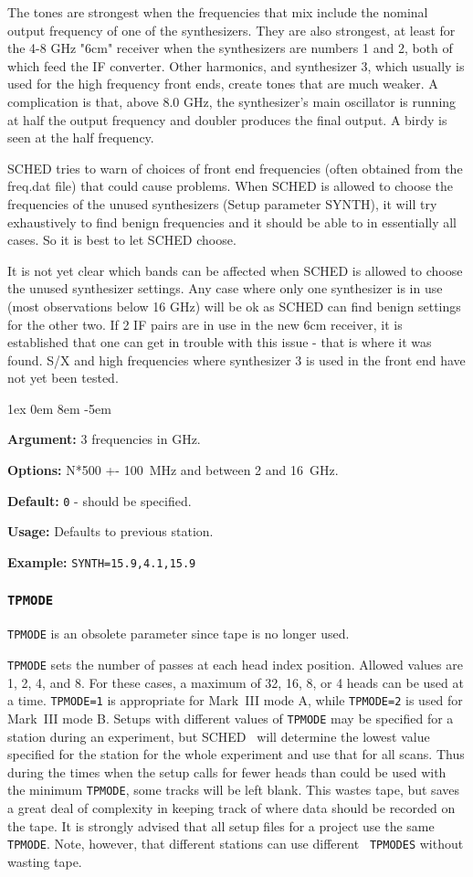 \documentclass{report}
\newcommand{\schedb}{{\sc SCHED~}}
\newcommand{\rcwbox}[5]{
  \begin{list}{}{\parsep 1ex  \itemsep 0em
                 \leftmargin 8em  \itemindent -5em }
    \item {\bf Argument:} #1
    \item {\bf Options:}  #2
    \item {\bf Default:}  #3
    \item {\bf Usage:}    #4
    \item {\bf Example:}  #5
  \end{list}
}
\begin{document}
The tones are strongest when the frequencies that mix include the
nominal output frequency of one of the synthesizers.  They are also
strongest, at least for the 4-8 GHz "6cm" receiver when the
synthesizers are numbers 1 and 2, both of which feed the IF converter.
Other harmonics, and synthesizer 3, which usually is used for the high
frequency front ends, create tones that are much weaker.  A
complication is that, above 8.0 GHz, the synthesizer's main oscillator
is running at half the output frequency and doubler produces the final
output.  A birdy is seen at the half frequency.

SCHED tries to warn of choices of front end frequencies (often
obtained from the freq.dat file) that could cause problems.  When
SCHED is allowed to choose the frequencies of the unused synthesizers
(Setup parameter SYNTH), it will try exhaustively to find benign
frequencies and it should be able to in essentially all cases.  So it
is best to let SCHED choose.

It is not yet clear which bands can be affected when SCHED is allowed
to choose the unused synthesizer settings.  Any case where only one
synthesizer is in use (most observations below 16 GHz) will be ok as
SCHED can find benign settings for the other two.  If 2 IF pairs are
in use in the new 6cm receiver, it is established that one can get in
trouble with this issue - that is where it was found. S/X and high
frequencies where synthesizer 3 is used in the front end have not yet
been tested.

\rcwbox
{3 frequencies in GHz.}
{N*500 +- 100~MHz and between 2 and 16~GHz.}
{{\tt 0} - should be specified.}
{Defaults to previous station.}
{{\tt SYNTH=15.9,4.1,15.9}}


\subsubsection{\label{SP:TPMODE}{\tt TPMODE}}

{\tt TPMODE} is an obsolete parameter since tape is no longer used.

{\tt TPMODE} sets the number of passes at each head index
position. Allowed values are 1, 2, 4, and 8. For these cases, a
maximum of 32, 16, 8, or 4 heads can be used at a time. {\tt TPMODE=1}
is appropriate for Mark~III mode A, while {\tt TPMODE=2} is used for
Mark~III mode B. Setups with different values of {\tt TPMODE}
may be specified for a station during an experiment, but \schedb
will determine the lowest value specified for the station for the
whole experiment and use that for all scans.  Thus during the times
when the setup calls for fewer heads than could be used with the
minimum {\tt TPMODE}, some tracks will be left blank.  This wastes
tape, but saves a great deal of complexity in keeping track of
where data should be recorded on the tape.  It is strongly advised
that all setup files for a project use the same {\tt TPMODE}.
Note, however, that different stations can use different {\tt
TPMODES} without wasting tape.
\end{document}
